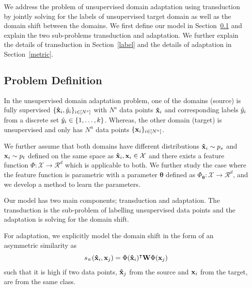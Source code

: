 We address the problem of unsupervised domain adaptation using transduction by jointly solving for the labels of unsupervised target domain as well as the domain shift between the domains. We first define our model in Section~\ref{prob:def} and explain the two sub-problems transduction and adaptation. We further explain the details of transduction in Section~\ref{label} and the details of adaptation in Section~\ref{metric}.

\subsection{Problem Definition}
\label{prob:def}
In the unsupervised domain adaptation problem, one of the domains (source) is fully supervised $\{\mathbf{\hat{x}}_i, \hat{y}_i \}_{i \in [N^s]}$ with $N^s$ data points $\mathbf{\hat{x}}_i$ and corresponding labels $\hat{y}_i$ from a discrete set $\hat{y}_i \in \{1,\ldots, k \}$. Whereas, the other domain (target) is unsupervised and only has $N^u$ data points $\{\mathbf{x}_i \}_{i \in [N^u]}$. 

We further assume that both domains have different distributions $\mathbf{\hat{x}}_i \sim p_s$ and $\mathbf{x}_i \sim p_t$ defined on the same space as $\mathbf{\hat{x}}_i,\mathbf{x}_i \in \mathcal{X}$ and there exists a feature function \mbox{$\Phi:\mathcal{X}\rightarrow \mathcal{R}^d$} which is applicable to both. We further study the case where the feature function is parametric with a parameter $\mathbf{\theta}$ defined as \mbox{$\Phi_\mathbf{\theta}:\mathcal{X}\rightarrow \mathcal{R}^d$}, and we develop a method to learn the parameters.

Our model has two main components; transduction and adaptation. The transduction is the sub-problem of labelling unsupervised data points and the adaptation is solving for the domain shift. 

For adaptation, we explicitly model the domain shift in the form of an asymmetric similarity as
\begin{equation}
\sw(\xsi,\xuj) = \Phi(\xsi)^\intercal \mathbf{W} \Phi(\xuj)
\end{equation}
such that it is high if two data points, $\mathbf{\hat{x}}_j$ from the source and $\mathbf{x}_i$ from the target, are from the same class.

